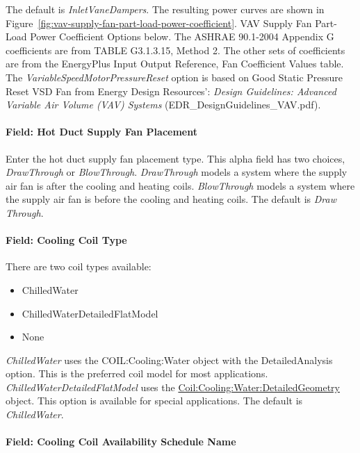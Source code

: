 The default is \emph{InletVaneDampers}. The resulting power curves are shown in Figure~\ref{fig:vav-supply-fan-part-load-power-coefficient}. VAV Supply Fan Part-Load Power Coefficient Options below. The ASHRAE 90.1-2004 Appendix G coefficients are from TABLE G3.1.3.15, Method 2. The other sets of coefficients are from the EnergyPlus Input Output Reference, Fan Coefficient Values table. The \emph{VariableSpeedMotorPressureReset} option is based on Good Static Pressure Reset VSD Fan from Energy Design Resources': \emph{Design Guidelines: Advanced Variable Air Volume (VAV) Systems} (EDR\_DesignGuidelines\_VAV.pdf).

\paragraph{Field: Hot Duct Supply Fan Placement}\label{field-hot-duct-supply-fan-placement}

Enter the hot duct supply fan placement type. This alpha field has two choices, \emph{DrawThrough} or \emph{BlowThrough}. \emph{DrawThrough} models a system where the supply air fan is after the cooling and heating coils. \emph{BlowThrough} models a system where the supply air fan is before the cooling and heating coils. The default is \emph{Draw Through}.

\paragraph{Field: Cooling Coil Type}\label{field-cooling-coil-type-11}

There are two coil types available:

\begin{itemize}
\item
  ChilledWater
\item
  ChilledWaterDetailedFlatModel
\item
  None
\end{itemize}

\emph{ChilledWater} uses the COIL:Cooling:Water object with the DetailedAnalysis option. This is the preferred coil model for most applications. \emph{ChilledWaterDetailedFlatModel} uses the \hyperref[coilcoolingwaterdetailedgeometry]{Coil:Cooling:Water:DetailedGeometry} object. This option is available for special applications. The default is \emph{ChilledWater}.

\paragraph{Field: Cooling Coil Availability Schedule Name}\label{field-cooling-coil-availability-schedule-name-10}

